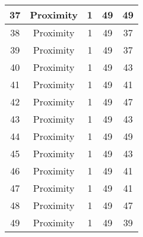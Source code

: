\documentclass[results.tex]{subfiles}
\begin{document}
\begin{center}
\begin{tabular}{| c || c | c | c | c |}
            \hline
            37                      & Proximity                    & 1                      & 49                      & 49                   \\
            \hline
            38                      & Proximity                    & 1                      & 49                      & 37                   \\
            \hline
            39                      & Proximity                    & 1                      & 49                      & 37                   \\
            \hline
            40                      & Proximity                    & 1                      & 49                      & 43                   \\
            \hline
            41                      & Proximity                    & 1                      & 49                      & 41                   \\
            \hline
            42                      & Proximity                    & 1                      & 49                      & 47                   \\
            \hline
            43                      & Proximity                    & 1                      & 49                      & 43                   \\
            \hline
            44                      & Proximity                    & 1                      & 49                      & 49                   \\
            \hline
            45                      & Proximity                    & 1                      & 49                      & 43                   \\
            \hline
            46                      & Proximity                    & 1                      & 49                      & 41                   \\
            \hline
            47                      & Proximity                    & 1                      & 49                      & 41                   \\
            \hline
            48                      & Proximity                    & 1                      & 49                      & 47                   \\
            \hline
            49                      & Proximity                    & 1                      & 49                      & 39                   \\
            \hline
        \end{tabular}
    \end{center}
\end{document}
